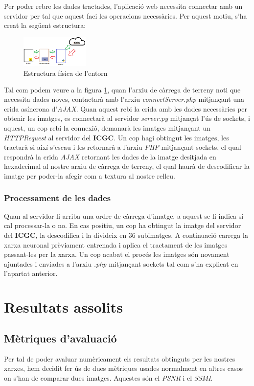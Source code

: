 ﻿\documentclass[10pt,a4paper,twocolumn,twoside]{article}
\begin{document}
Per poder rebre les dades tractades, l'aplicació web necessita connectar amb un servidor per tal que aquest faci les operacions necessàries. Per aquest motiu, s'ha creat la següent estructura:
\begin{figure}[h]
\centering
\includegraphics[width=0.3\textwidth]{img/disseny.png}
\caption{Estructura física de l'entorn}
\label{img:fisica}
\end{figure}
Tal com podem veure a la figura \ref{img:fisica}, quan l'arxiu de càrrega de terreny noti que necessita dades noves, contactarà amb l'arxiu \textit{connectServer.php} mitjançant una crida asíncrona d'\textit{AJAX}. Quan aquest rebi la crida amb les dades necessàries per obtenir les imatges, es connectarà al servidor \textit{server.py} mitjançat l'ús de sockets, i aquest, un cop rebi la connexió, demanarà les imatges mitjançant un \textit{HTTPRequest} al servidor del \textbf{ICGC}. Un cop hagi obtingut les imatges, les tractarà si així s'escau i les retornarà a l'arxiu \textit{PHP} mitjançant sockets, el qual respondrà la crida \textit{AJAX} retornant les dades de la imatge desitjada en hexadecimal al nostre arxiu de càrrega de terreny, el qual haurà de descodificar la imatge per poder-la afegir com a textura al nostre relleu.

\subsubsection{Processament de les dades}
Quan al servidor li arriba una ordre de càrrega d'imatge, a aquest se li indica si cal processar-la o no. En cas positiu, un cop ha obtingut la imatge del servidor del \textbf{ICGC}, la descodifica i la divideix en 36 subimatges. A continuació carrega la xarxa neuronal prèviament entrenada i aplica el tractament de les imatges passant-les per la xarxa. Un cop acabat el procés les imatges són novament ajuntades i enviades a l'arxiu \textit{.php} mitjançant sockets tal com s'ha explicat en l'apartat anterior.
\section{Resultats assolits}
\subsection{Mètriques d'avaluació}
Per tal de poder avaluar numèricament els resultats obtinguts per les nostres xarxes, hem decidit fer ús de dues mètriques usades normalment en altres casos on s'han de comparar dues imatges. Aquestes són el \textit{PSNR} i el \textit{SSMI}.
\end{document}
